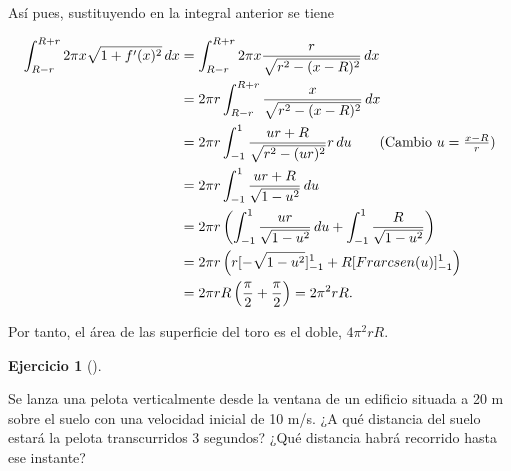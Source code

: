 \documentclass[
  a4paper,
]{scrreport}
\theoremstyle{definition}
\newtheorem{exercise}{Ejercicio}[chapter]
\theoremstyle{remark}
\begin{document}
\begin{tcolorbox}
Así pues, sustituyendo en la integral anterior se tiene

\begin{align*}
\int_{R-r}^{R+r} 2\pi x \sqrt{1+f'(x)^2}\,dx 
&= \int_{R-r}^{R+r} 2\pi x \frac{r}{\sqrt{r^2-(x-R)^2}}\,dx \\
&= 2\pi r \int_{R-r}^{R+r} \frac{x}{\sqrt{r^2-(x-R)^2}}\,dx \\
&= 2\pi r \int_{-1}^1 \frac{ur+R}{\sqrt{r^2-(ur)^2}}r\,du \tag{Cambio $u=\frac{x-R}{r}$}\\
&= 2\pi r \int_{-1}^1 \frac{ur+R}{\sqrt{1-u^2}}\,du \\
&= 2\pi r \left(\int_{-1}^1 \frac{ur}{\sqrt{1-u^2}}\,du + \int_{-1}^1 \frac{R}{\sqrt{1-u^2}}\right) \\
&= 2\pi r \left(r[-\sqrt{1-u^2}]_{-1}^1 + R[\operatorname{arcsen}(u)]_{-1}^1\right) \\
&= 2\pi r R\left(\frac{\pi}{2}+\frac{\pi}{2}\right)
= 2\pi^2 r R.
\end{align*}

Por tanto, el área de las superficie del toro es el doble,
\(4\pi^2 r R\).

\end{tcolorbox}

\begin{exercise}[]\protect\hypertarget{exr-cinematica-1}{}\label{exr-cinematica-1}

Se lanza una pelota verticalmente desde la ventana de un edificio
situada a 20 m sobre el suelo con una velocidad inicial de 10 m/s. ¿A
qué distancia del suelo estará la pelota transcurridos 3 segundos? ¿Qué
distancia habrá recorrido hasta ese instante?

\end{exercise}
\end{document}
